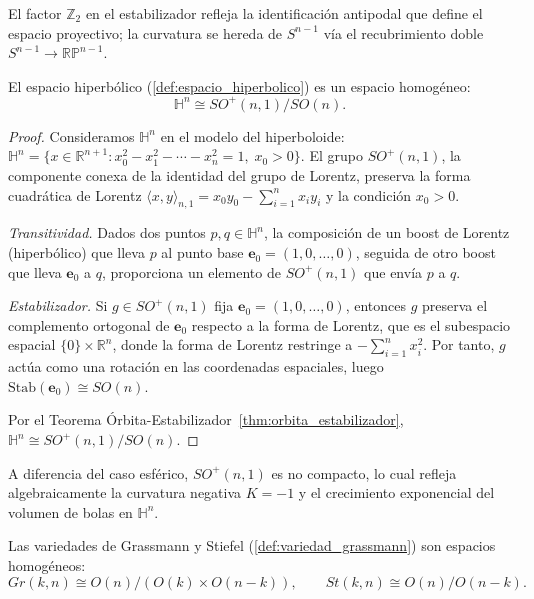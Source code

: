 El factor $\mathbb{Z}_2$ en el estabilizador refleja la identificación antipodal que define el espacio proyectivo; la curvatura se hereda de $S^{n-1}$ vía el recubrimiento doble $S^{n-1} \to \mathbb{RP}^{n-1}$.

\begin{proposition}\label{prop:hiperbolico_cociente}
El espacio hiperbólico (\autoref{def:espacio_hiperbolico}) es un espacio homogéneo:
\[
\mathbb{H}^n \cong SO^+(n,1)/SO(n).
\]
\end{proposition}

\begin{proof}
Consideramos $\mathbb{H}^n$ en el modelo del hiperboloide: $\mathbb{H}^n = \{x \in \mathbb{R}^{n+1} : x_0^2 - x_1^2 - \cdots - x_n^2 = 1, \; x_0 > 0\}$. El grupo $SO^+(n,1)$, la componente conexa de la identidad del grupo de Lorentz, preserva la forma cuadrática de Lorentz $\langle x, y \rangle_{n,1} = x_0 y_0 - \sum_{i=1}^n x_i y_i$ y la condición $x_0 > 0$.

\textit{Transitividad.} Dados dos puntos $p, q \in \mathbb{H}^n$, la composición de un boost de Lorentz (hiperbólico) que lleva $p$ al punto base $\mathbf{e}_0 = (1,0,\ldots,0)$, seguida de otro boost que lleva $\mathbf{e}_0$ a $q$, proporciona un elemento de $SO^+(n,1)$ que envía $p$ a $q$.

\textit{Estabilizador.} Si $g \in SO^+(n,1)$ fija $\mathbf{e}_0 = (1,0,\ldots,0)$, entonces $g$ preserva el complemento ortogonal de $\mathbf{e}_0$ respecto a la forma de Lorentz, que es el subespacio espacial $\{0\} \times \mathbb{R}^n$, donde la forma de Lorentz restringe a $-\sum_{i=1}^n x_i^2$. Por tanto, $g$ actúa como una rotación en las coordenadas espaciales, luego $\mathrm{Stab}(\mathbf{e}_0) \cong SO(n)$.

Por el Teorema Órbita-Estabilizador~\ref{thm:orbita_estabilizador}, $\mathbb{H}^n \cong SO^+(n,1)/SO(n)$.
\end{proof}

A diferencia del caso esférico, $SO^+(n,1)$ es no compacto, lo cual refleja algebraicamente la curvatura negativa $K=-1$ y el crecimiento exponencial del volumen de bolas en $\mathbb{H}^n$.

\begin{proposition}\label{prop:grassmann_stiefel_cociente}
Las variedades de Grassmann y Stiefel (\autoref{def:variedad_grassmann}) son espacios homogéneos:
\[
Gr(k,n) \cong O(n)/(O(k) \times O(n-k)), \qquad St(k,n) \cong O(n)/O(n-k).
\]
\end{proposition}

